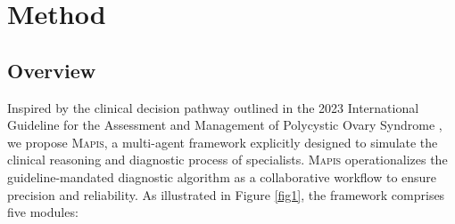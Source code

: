 \documentclass[a4paper,fleqn]{cas-dc}
\begin{document}
\section{Method}

\subsection{Overview}
Inspired by the clinical decision pathway outlined in the 2023 International Guideline for the Assessment and Management of Polycystic Ovary Syndrome \cite{teede2023international}, we propose \textsc{Mapis}, a multi-agent framework explicitly designed to simulate the clinical reasoning and diagnostic process of specialists. \textsc{Mapis} operationalizes the guideline-mandated diagnostic algorithm as a collaborative workflow to ensure precision and reliability. As illustrated in Figure \ref{fig1}, the framework comprises five modules:
\end{document}
